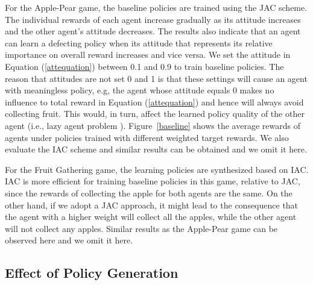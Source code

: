 \documentclass{article}
\begin{document}
For the Apple-Pear game, the baseline policies are trained using the JAC scheme. The individual rewards of each agent increase gradually as its attitude increases and the other agent's attitude decreases. The results also indicate that an agent can learn a defecting policy when its attitude
that represents its relative importance on overall reward
increases and vice versa. We set the attitude in Equation (\ref{attequation}) between 0.1 and 0.9 to train baseline policies. The reason that attitudes are not set 0 and 1 is that these settings will cause an agent with meaningless policy,
e.g, the agent whose attitude equals $0$ makes no influence to total reward in Equation (\ref{attequation}) and hence will always avoid collecting fruit.
This would, in turn, affect the learned policy quality of the other agent (i.e., lazy agent problem \cite{perolat2017multi}). Figure~\ref{baseline} shows the average rewards of agents under policies trained with different weighted target rewards. We also evaluate the IAC scheme and similar results can be obtained and we omit it here.

For the Fruit Gathering game, the learning policies are synthesized based on IAC. IAC is more efficient for training baseline policies in this game, relative to JAC, since the rewards of collecting the apple for both agents are the same. On the other hand, if we adopt a JAC approach, it might lead to the consequence that the agent with a higher weight will collect all the apples, while the other agent will not collect any apples. Similar results as the Apple-Pear game can be observed here and we omit it here.
\subsection{Effect of Policy Generation}
\end{document}
